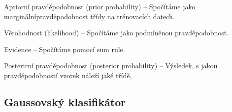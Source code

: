 \begin{compactitem}
    \begin{compactitem}
        \item Apriorní pravděpodobnost (prior probability) -- Spočítáme jako marginální\break pravděpodobnost třídy na trénovacích datech.

        \item Věrohodnost (likelihood) -- Spočítáme jako podmíněnou pravděpodobnost.

        \item Evidence -- Spočítáme pomocí sum rule.

        \item Posterirní pravděpodobnost (posterior probability) -- Výsledek, s jakou pravděpodobností vzorek náleží jaké třídě,
    \end{compactitem}
\end{compactitem}

\subsection{Gaussovský klasifikátor}

